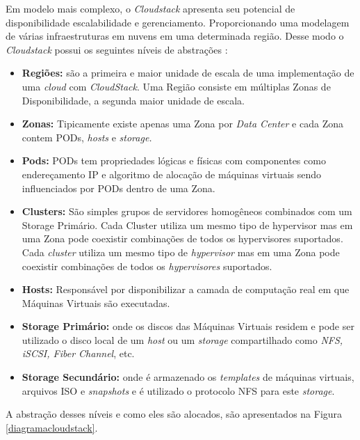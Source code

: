 Em modelo mais complexo, o \textit{Cloudstack} apresenta seu potencial de disponibilidade escalabilidade e gerenciamento. Proporcionando uma modelagem de várias infraestruturas em nuvens em uma determinada região. Desse modo o \textit{Cloudstack} possui os seguintes níveis de abstrações \cite{shape}:

\begin{itemize}
\item \textbf{Regiões:} são a primeira e maior unidade de escala de uma implementação de uma \textit{cloud} com \textit{CloudStack}. Uma Região consiste em múltiplas Zonas de Disponibilidade, a segunda maior unidade de escala.
\item \textbf{Zonas: } Tipicamente existe apenas uma Zona por \textit{Data Center} e cada Zona contem PODs, \textit{hosts} e \textit{storage.}
\item \textbf{Pods: } PODs tem propriedades lógicas e físicas com componentes como endereçamento IP e algoritmo de alocação de máquinas virtuais sendo influenciados por PODs dentro de uma Zona.
\item \textbf{Clusters: } São simples grupos de servidores homogêneos combinados com um Storage Primário. Cada Cluster utiliza um mesmo tipo de hypervisor mas em uma Zona pode coexistir combinações de todos os hypervisores suportados. Cada \textit{cluster} utiliza um mesmo tipo de \textit{hypervisor} mas em uma Zona pode coexistir combinações de todos os \textit{hypervisores} suportados.
\item \textbf{Hosts: } Responsável por disponibilizar a camada de computação real em que Máquinas Virtuais são executadas.
\item \textbf{Storage Primário: }  onde os discos das Máquinas Virtuais residem e pode ser utilizado o disco local de um \textit{host} ou um \textit{storage} compartilhado como \textit{NFS, iSCSI, Fiber Channel}, etc.
\item \textbf{Storage Secundário:} onde é armazenado os \textit{templates} de máquinas virtuais, arquivos ISO e \textit{snapshots} e é utilizado o protocolo NFS para este \textit{storage}.
\end{itemize}

A abstração desses níveis e como eles são alocados, são apresentados na Figura \ref{diagramacloudstack}.

